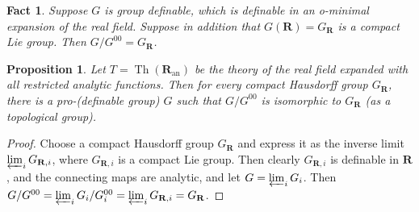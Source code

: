 \documentclass[final,a4paper,12pt]{amsart}
\newcommand{\bR}{{\mathbf{R}}}
\newcommand{\an}{\mathrm{an}}
\DeclareMathOperator{\Th}{{Th}}
\newtheorem{fct}[thm]{Fact}
\newtheorem{prop}[thm]{Proposition}
\theoremstyle{remark}
\theoremstyle{definition}
\begin{document}
	\begin{fct}
		Suppose $G$ is group definable, which is definable in an o-minimal expansion of the real field. Suppose in addition that $G(\bR)=G_\bR$ is a compact Lie group. Then $G/G^{00}=G_{\bR}$.
	\end{fct}
	
	\begin{prop}
		Let $T=\Th(\bR_{\an})$ be the theory of the real field expanded with all restricted analytic functions. Then for every compact Hausdorff group $G_{\bR}$, there is a pro-(definable group) $G$ such that $G/G^{00}$ is isomorphic to $G_{\bR}$ (as a topological group).
	\end{prop}
	\begin{proof}
		Choose a compact Hausdorff group $G_{\bR}$ and express it as the inverse limit $\varprojlim_i G_{\bR,i}$, where $G_{\bR,i}$ is a compact Lie group. Then clearly $G_{\bR,i}$ is definable in $\bR$, and the connecting maps are analytic, and let $G=\varprojlim_i G_i$. Then $G/G^{00}=\varprojlim_i G_i/G_i^{00}=\varprojlim_i G_{\bR,i}=G_{\bR}$.
	\end{proof}
\end{document}
